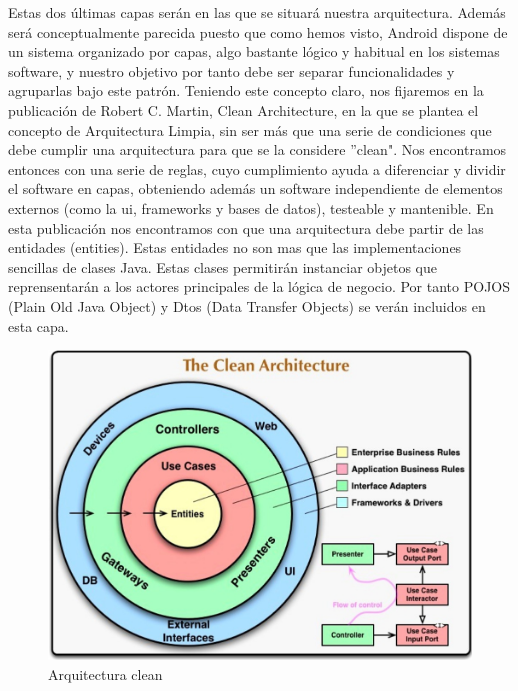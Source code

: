 \documentclass[12pt,a4paper,oneside]{book} %
\begin{document}
Estas dos últimas capas serán en las que se situará nuestra arquitectura. Además será conceptualmente parecida puesto que como hemos visto, Android dispone de un sistema organizado por capas, algo bastante lógico y habitual en los sistemas software, y nuestro objetivo por tanto debe ser separar funcionalidades y agruparlas bajo este patrón.
\newline
\newline
Teniendo este concepto claro, nos fijaremos en la publicación de Robert C. Martin, Clean Architecture, en la que se plantea el concepto de Arquitectura Limpia, sin ser más que una serie de condiciones que debe cumplir una arquitectura para que se la considere ”clean". Nos encontramos entonces con una serie de reglas, cuyo cumplimiento ayuda a diferenciar y dividir el software en capas, obteniendo además un software independiente de elementos externos (como la ui, frameworks y bases de datos), testeable y mantenible. 
\newline
\newline
En esta publicación nos encontramos con que una arquitectura debe partir de las entidades (entities). Estas entidades no son mas que las implementaciones sencillas de clases Java. 
\newline
\newline
Estas clases permitirán instanciar objetos que reprensentarán a los actores principales de la lógica de negocio. Por tanto POJOS (Plain Old Java Object) y Dtos (Data Transfer Objects) se verán incluidos en esta capa. 
\begin{figure}[H]
	\begin{center}
		\includegraphics[scale=0.3]{pictures/architecture/android_architecture.png} 
	\end{center}
	\caption[Clean Architecture]{Arquitectura clean}
\end{figure}
\end{document}
